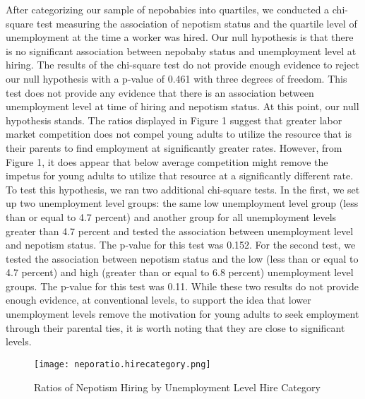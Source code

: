 \documentclass[12pt]{article}
\begin{document}
After categorizing our sample of nepobabies into quartiles, we conducted a chi-square test measuring the association of nepotism status and the quartile level of unemployment at the time a worker was hired. Our null hypothesis is that there is no significant association between nepobaby status and unemployment level at hiring. The results of the chi-square test do not provide enough evidence to reject our null hypothesis with a p-value of 0.461 with three degrees of freedom. This test does not provide any evidence that there is an association between unemployment level at time of hiring and nepotism status. At this point, our null hypothesis stands. The ratios displayed in Figure 1 suggest that greater labor market competition does not compel young adults to utilize the resource that is their parents to find employment at significantly greater rates. However, from Figure 1, it does appear that below average competition might  remove the impetus for young adults to utilize that resource at a significantly different rate. To test this hypothesis, we ran two additional chi-square tests. In the first, we set up two unemployment level groups: the same low unemployment level group (less than or equal to 4.7 percent) and another group for all unemployment levels greater than 4.7 percent and tested the association between unemployment level and nepotism status. The p-value for this test was 0.152. For the second test, we tested the association between nepotism status and the low (less than or equal to 4.7 percent) and high (greater than or equal to 6.8 percent) unemployment level groups. The p-value for this test was 0.11. While these two results do not provide enough evidence, at conventional levels, to support the idea that lower unemployment levels remove the motivation for young adults to seek employment through their parental ties, it is worth noting that they are close to significant levels.

\begin{figure}
    \centering
    \texttt{[image: neporatio.hirecategory.png]}
    \caption{Ratios of Nepotism Hiring by Unemployment Level Hire Category}
    \label{fig:enter-label}
\end{figure}
\end{document}
